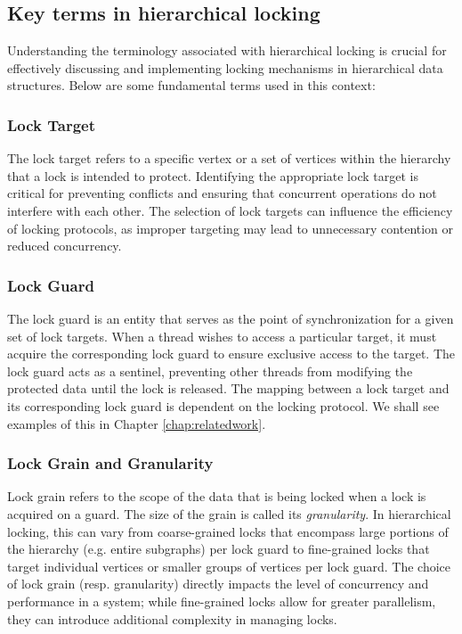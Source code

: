 \subsection{Key terms in hierarchical locking}

Understanding the terminology associated with hierarchical locking is crucial for effectively discussing and implementing locking mechanisms in hierarchical data structures. Below are some fundamental terms used in this context:

\subsubsection{Lock Target} The lock target refers to a specific vertex or a set of vertices within the hierarchy that a lock is intended to protect. Identifying the appropriate lock target is critical for preventing conflicts and ensuring that concurrent operations do not interfere with each other. The selection of lock targets can influence the efficiency of locking protocols, as improper targeting may lead to unnecessary contention or reduced concurrency.

\subsubsection{Lock Guard} The lock guard is an entity that serves as the point of synchronization for a given set of lock targets. When a thread wishes to access a particular target, it must acquire the corresponding lock guard to ensure exclusive access to the target. The lock guard acts as a sentinel, preventing other threads from modifying the protected data until the lock is released. The mapping between a lock target and its corresponding lock guard is dependent on the locking protocol. We shall see examples of this in Chapter \ref{chap:relatedwork}.

\subsubsection{Lock Grain and Granularity} Lock grain refers to the scope of the data that is being locked when a lock is acquired on a guard. The size of the grain is called its \emph{granularity}. In hierarchical locking, this can vary from coarse-grained locks that encompass large portions of the hierarchy (e.g. entire subgraphs) per lock guard to fine-grained locks that target individual vertices or smaller groups of vertices per lock guard. The choice of lock grain (resp. granularity) directly impacts the level of concurrency and performance in a system; while fine-grained locks allow for greater parallelism, they can introduce additional complexity in managing locks.


